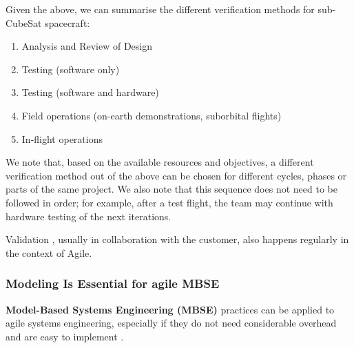 \documentclass[]{iac}
\begin{document}
Given the above, we can summarise the different verification methods for sub-CubeSat spacecraft: \autocite{ECSS-E-HB-10-02A}
\begin{enumerate}[itemsep=0pt]
    \item Analysis and Review of Design
    \item Testing (software only)
    \item Testing (software and hardware)
    \item Field operations (on-earth demonstrations, suborbital flights)
    \item In-flight operations
\end{enumerate}

We note that, based on the available resources and objectives, a different verification method out of the above can be chosen for different cycles, phases or parts of the same project. We also note that this sequence does not need to be followed in order; for example, after a test flight, the team may continue with hardware testing of the next iterations.

Validation \autocite{ECSS-E-HB-10-02A}, usually in collaboration with the customer, also happens regularly in the context of Agile.







\subsubsection{Modeling Is Essential for agile MBSE}

\textbf{Model-Based Systems Engineering (MBSE)} practices can be applied to agile systems engineering, especially if they do not need considerable overhead and are easy to implement \autocite{tang_mbse_2018,douglass_agile_2015}.
\end{document}
